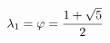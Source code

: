 \documentclass[preview]{standalone}
\begin{document}
\begin{align*}
\special{dvisvgm:raw <g id='unique000'>}\lambda_1 = \varphi = \frac{1 + \sqrt{5}}{2}\special{dvisvgm:raw </g>}
\end{align*}
\end{document}
